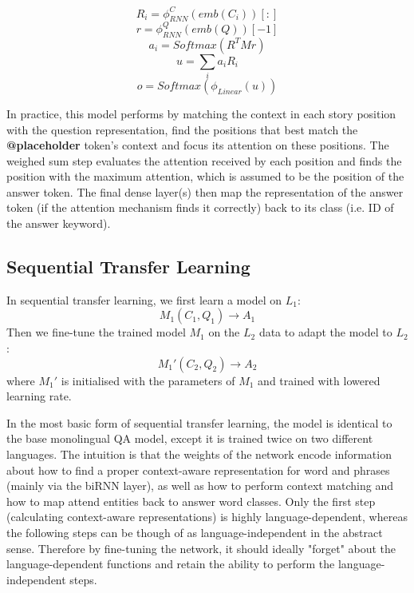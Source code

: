 \documentclass[]{article}
\begin{document}
\[ R_i = \phi_{RNN}^C(emb(C_i))[:] \] 
\[ r = \phi_{RNN}^Q(emb(Q))[-1] \]
\[ a_i = Softmax(R^T M r) \]
\[ u = \sum_i a_i R_i \]
\[ o = Softmax(\phi_{Linear}(u)) \]

In practice, this model performs by matching the context in each story position with the question representation, find the positions that best match the \textbf{@placeholder} token's context and focus its attention on these positions. The weighed sum step evaluates the attention received by each position and finds the position with the maximum attention, which is assumed to be the position of the answer token. The final dense layer(s) then map the representation of the answer token (if the attention mechanism finds it correctly) back to its class (i.e. ID of the answer keyword).

\subsection{Sequential Transfer Learning}

In sequential transfer learning, we first learn a model on $L_1$:
\[  M_1(C_1, Q_1) \to A_1\]
Then we fine-tune the trained model $M_1$ on the $L_2$ data to adapt the model to $L_2$:
\[  M_1'(C_2, Q_2) \to A_2\]
where $M_1'$ is initialised with the parameters of $M_1$ and trained with lowered learning rate.

In the most basic form of sequential transfer learning, the model is identical to the base monolingual QA model, except it is trained twice on two different languages. The intuition is that the weights of the network encode information about how to find a proper context-aware representation for word and phrases (mainly via the biRNN layer), as well as how to perform context matching and how to map attend entities back to answer word classes. Only the first step (calculating context-aware representations) is highly language-dependent, whereas the following steps can be though of as language-independent in the abstract sense. Therefore by fine-tuning the network, it should ideally "forget" about the language-dependent functions and retain the ability to perform the language-independent steps.
\end{document}
